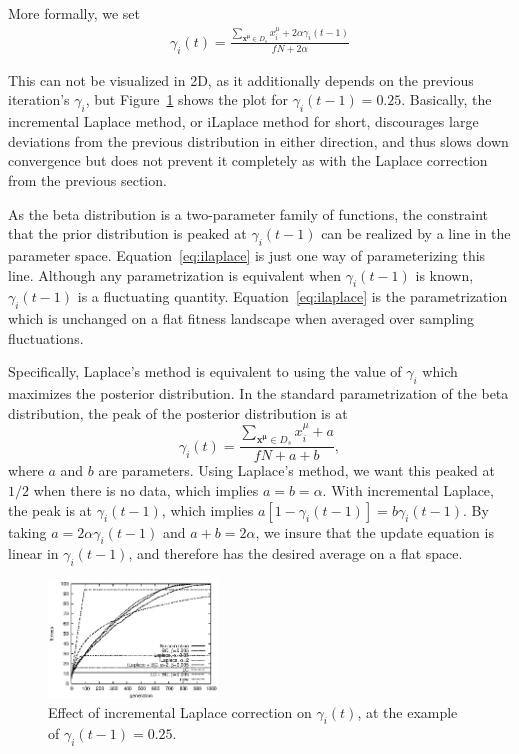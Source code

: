 \documentclass{acm_proc_article-sp}
\newcommand{\Np}{N}
\newcommand{\p}{\gamma}
\newcommand{\groups}[1]{\ensuremath{\left[ #1 \right]}}
\begin{document}
More formally, we set
\begin{eqnarray}
\p_i(t)= \frac{\sum_{\mathbf{x^\mu}\in D_s} x_i^\mu + 2\alpha\p_i(t-1)}{f\Np + 2\alpha}\label{eq:ilaplace}
\end{eqnarray}

This can not be visualized in 2D, as it
additionally depends on the previous iteration's $\p_i$, but Figure~\ref{fig:iLaplace}
shows the plot for $\p_i(t-1)=0.25$. Basically, the incremental Laplace method,
or iLaplace method for short, discourages large deviations
from the previous distribution in either direction, and thus slows down convergence but
does not prevent it completely as with the Laplace correction from the previous section.


As the beta distribution is a two-parameter family of functions, the
constraint that the prior distribution is peaked at $\p_i(t-1)$ can be realized
by a line in the parameter space. Equation~\ref{eq:ilaplace} is just one way
of parameterizing this line. Although any parametrization is equivalent when
$\p_i(t-1)$ is known, $\p_i(t-1)$ is a fluctuating
quantity. Equation~\ref{eq:ilaplace} is the parametrization which is unchanged
on a flat fitness landscape when averaged over sampling fluctuations.  

Specifically, Laplace's method is equivalent to using the value of $\p_i$
which maximizes the posterior distribution. In the standard parametrization of
the beta distribution, the peak of the posterior distribution is at  
\begin{equation}
\p_i(t)= \frac{\sum_{\mathbf{x^\mu}\in D_s} x_i^\mu + a}{f\Np + a + b} ,\label{eq:laplaceGeneric}
\end{equation}
where $a$ and $b$ are parameters. 
Using Laplace's method, we want this peaked at $1/2$ when there is no data,
which implies $a=b=\alpha$. With incremental Laplace, the peak is at
$\p_i(t-1)$, which implies $a\groups{1-\p_i(t-1)} = b\p_i(t-1)$.  By taking
$a=2\alpha \p_i(t-1)$ and $a+b=2\alpha$,  we insure that the update equation
is linear in $\p_i(t-1)$, and therefore has the desired average on a flat
space.  

\begin{figure}
\centerline{
\includegraphics[width=0.4\textwidth]{graph_leading1169910391/graph_leading000_fitness.eps}}
\caption{Effect of incremental Laplace correction on $\p_i(t)$, at the example
of $\p_i(t-1)=0.25$.\label{fig:iLaplace}}
\end{figure}
\end{document}
